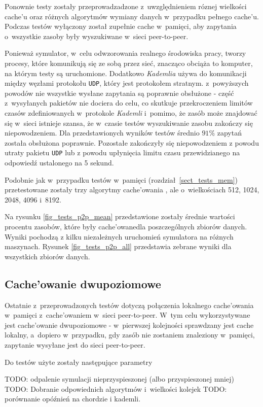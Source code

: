 \documentclass[a4paper,11pt]{scrartcl}
\newcommand{\f}{\texttt}
\newcommand{\s}{ }
\newcommand{\kesz}{cache}
\newcommand{\keszu}{cache'u}
\newcommand{\keszowania}{cache'owania}
\newcommand{\keszowane}{cache'owane}
\newcommand{\keszowanie}{cache'owanie}
\newcommand{\Keszowanie}{Cache'owanie}
\newcommand{\keszowaniem}{cache'owaniem}
\begin{document}
Ponownie testy zostały przeprowadzadzone z~uwzględnieniem róznej wielkości \keszu\s oraz różnych algorytmów wymiany danych w~przypadku pełnego \keszu. Podczas testów wyłączony został zupełnie \kesz\s w~pamięci, aby zapytania o~wszystkie zasoby były wyszukiwane w~sieci peer-to-peer.

Ponieważ symulator, w~celu odwzorowania realnego środowiska pracy, tworzy procesy, które komunikują się ze sobą przez sieć, znacząco obciąża to komputer, na którym testy są uruchomione. Dodatkowo \textit{Kademlia} używa do komunikacji między węzłami protokołu \f{UDP}, który jest protokołem stratnym. z~powyższych powodów nie wszystkie wysłane zapytania są poprawnie obsłużone - część z~wysyłanych pakietów nie dociera do celu, co skutkuje przekroczeniem limitów czasów zdefiniowanych w~protokole \textit{Kademli} i~pomimo, że zasób może znajdować się w~sieci istnieje szansa, że w~czasie testów wyszukiwanie zasobu zakończy się niepowodzeniem.
Dla przedstawionych wyników testów średnio $91\%$ zapytań została obsłużona poprawnie. Pozostałe zakończyły się niepowodzeniem z powodu utraty pakietu \f{UDP} lub z powodu upłynięcia limitu czasu przewidzianego na odpowiedź ustalonego na 5 sekund.

Podobnie jak w~przypadku testów w~pamięci (rozdział~\ref{sect_tests_mem}) przetestowane zostały trzy algorytmy \keszowania\s, ale o~wielkościach 512, 1024, 2048, 4096 i~8192.

Na rysunku \ref{fig_tests_p2p_mean} przedstawione zostały średnie wartości procentu zasobów, które były \keszowane dla poszczególnych zbiorów danych. Wyniki pochodzą z kilku niezależnych uruchomień symulatora na różnych maszynach. Rysunek \ref{fig_tests_p2p_all} przedstawia zebrane wyniki dla wszystkich zbiorów danych.

\subsection{\Keszowanie\s dwupoziomowe}
Ostatnie z~przeprowadzonych testów dotyczą połączenia lokalnego \keszowania\s w~pamięci z~\keszowaniem\s w~sieci peer-to-peer. W~tym celu wykorzystywane jest \keszowanie\s dwupoziomowe - w~pierwszej kolejności sprawdzany jest \kesz\s lokalny, a~dopiero w~przypadku, gdy zasób nie zostaniem znaleziony w~pamięci, zapytanie wysyłane jest do sieci peer-to-peer.

Do testów użyte zostały następujące parametry

TODO: odpalenie symulacji nieprzyspieszonej (albo przyspieszonej mniej)
TODO: Dobranie odpowiednich algorytmów i~wielkości kolejek
TODO: porównanie opóźnień na chordzie i kademli.
\end{document}
